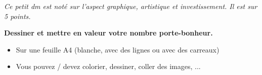 



\textit{Ce petit dm est noté sur l'aspect graphique, artistique et investissement. Il est sur 5 points.}

\textbf{Dessiner et mettre en valeur votre nombre porte-bonheur.}

\begin{itemize}
  \item Sur une feuille A4 (blanche, avec des lignes ou avec des carreaux)
  \item Vous pouvez / devez colorier, dessiner, coller des images, ...
\end{itemize}


